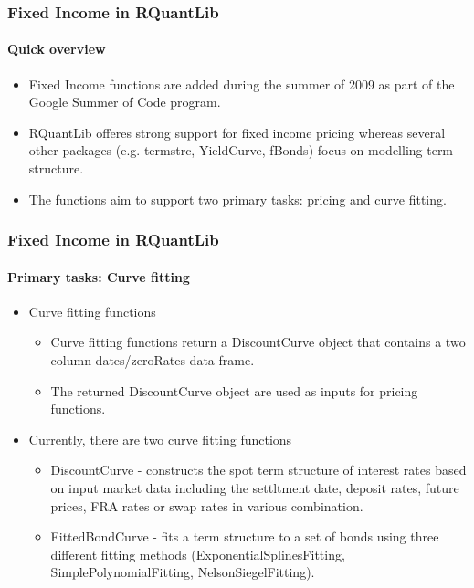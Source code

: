 \documentclass[smaller,compress, 9pt]{beamer}
\begin{document}
\begin{frame}
	\frametitle{Fixed Income in RQuantLib}
	\framesubtitle{Quick overview}
	\begin{itemize}
		\item Fixed Income functions are added during the summer of 2009 as part of the Google Summer of 	Code program. 
		\item  RQuantLib offeres strong support for fixed income pricing whereas several other packages (e.g. termstrc, YieldCurve, fBonds) focus on modelling term structure.		
		\item The functions aim to support two primary tasks: pricing and curve fitting. 		
	\end{itemize}
\end{frame}

\begin{frame}
	\frametitle{Fixed Income in RQuantLib}
	\framesubtitle{Primary tasks: Curve fitting}
	\begin{itemize}
		\item Curve fitting functions
			\begin{itemize}
				\item Curve fitting functions return a DiscountCurve object that contains a two column dates/zeroRates data frame.
				\item The returned DiscountCurve object are used as inputs for pricing functions. 
			\end{itemize}
		\item Currently, there are two curve fitting functions
			\begin{itemize}
				\item DiscountCurve - constructs the spot term structure of interest rates based on input market data including the settltment date, deposit rates, future prices, FRA rates or swap rates in various combination.
				\item FittedBondCurve - fits a term structure to a set of bonds using three different fitting methods (ExponentialSplinesFitting, SimplePolynomialFitting, NelsonSiegelFitting).
			\end{itemize}
	\end{itemize}
\end{frame}
\end{document}

